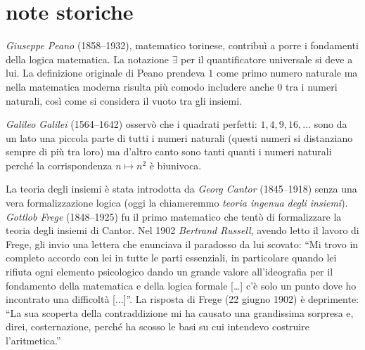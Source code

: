 \section{note storiche}

\label{nota:Peano}%
%
\emph{Giuseppe Peano} (1858--1932), matematico torinese, contribuì a porre 
i fondamenti della logica matematica. 
La notazione $\exists$ per il quantificatore universale si deve a lui.
La definizione originale di Peano prendeva $1$ come primo numero
naturale ma nella matematica moderna risulta più comodo includere anche $0$ 
tra i numeri naturali, così come si considera il vuoto tra gli insiemi.

\label{nota:Galileo}%
%
\emph{Galileo Galilei} (1564--1642) osservò che i quadrati 
perfetti: $1,4,9,16,\dots$ sono da un lato una piccola parte 
di tutti i numeri naturali (questi numeri si distanziano 
sempre di più tra loro) ma d'altro canto sono tanti quanti i numeri naturali 
perché la corrispondenza $n\mapsto n^2$ è biunivoca.

\label{nota:Cantor}%
%
\label{nota:Russell}%
%
\label{nota:Frege}%
%
La teoria degli insiemi
è stata introdotta da \emph{Georg Cantor} (1845--1918) senza una vera formalizzazione logica
(oggi la chiameremmo \emph{teoria ingenua degli insiemi}).
\emph{Gottlob Frege} (1848--1925) fu il primo matematico che tentò di formalizzare 
la teoria degli insiemi di Cantor. 
Nel 1902 \emph{Bertrand Russell}, avendo letto il lavoro di Frege, 
gli invio una lettera che enunciava il paradosso da lui scovato:
``Mi trovo in completo accordo con lei in tutte le parti essenziali, in particolare
quando lei rifiuta ogni elemento psicologico dando un grande valore
all'ideografia %
per il fondamento della matematica e della logica formale [\dots] c'è solo
un punto dove ho incontrato una difficoltà [...]''.
La risposta di Frege (22 giugno 1902) è deprimente:
``La sua scoperta della contraddizione mi ha causato una grandissima sorpresa e,
direi, costernazione, perché ha scosso le basi su cui intendevo costruire l'aritmetica.''

